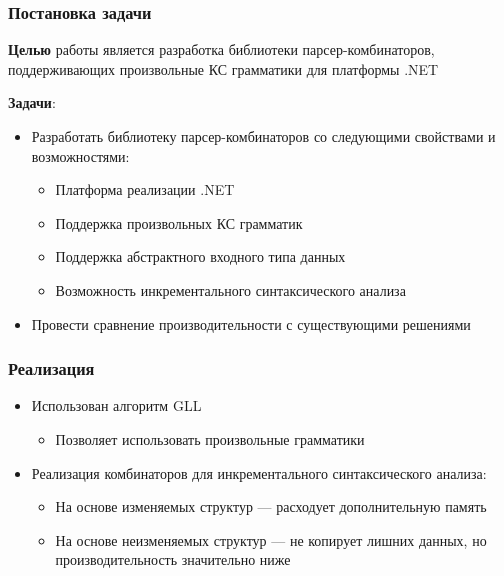\documentclass{beamer}
\begin{document}
\begin{frame}[fragile]
  \transwipe[direction=90]
  \frametitle{Постановка задачи}
  \textbf{Целью} работы является разработка библиотеки парсер-комбинаторов, поддерживающих произвольные КС грамматики для платформы .NET

  \textbf{Задачи}:
  \begin{itemize}
    \item Разработать библиотеку парсер-комбинаторов со следующими свойствами и возможностями:
    \begin{itemize}
      \item Платформа реализации .NET
      \item Поддержка произвольных КС грамматик
      \item Поддержка абстрактного входного типа данных
      \item Возможность инкрементального синтаксического анализа
    \end{itemize}
    \item Провести сравнение производительности с существующими решениями
  \end{itemize}
\end{frame}

\begin{frame}[fragile]
  \transwipe[direction=90]
  \frametitle{Реализация}
  \begin{itemize}
    \item Использован алгоритм GLL
    \begin{itemize}
      \item Позволяет использовать произвольные грамматики
    \end{itemize}
    \item Реализация комбинаторов для инкрементального синтаксического анализа:
    \begin{itemize}
      \item На основе изменяемых структур --- расходует дополнительную память
      \item На основе неизменяемых структур --- не копирует лишних данных, но производительность значительно ниже
    \end{itemize}
  \end{itemize}
\end{frame}

\end{document}
